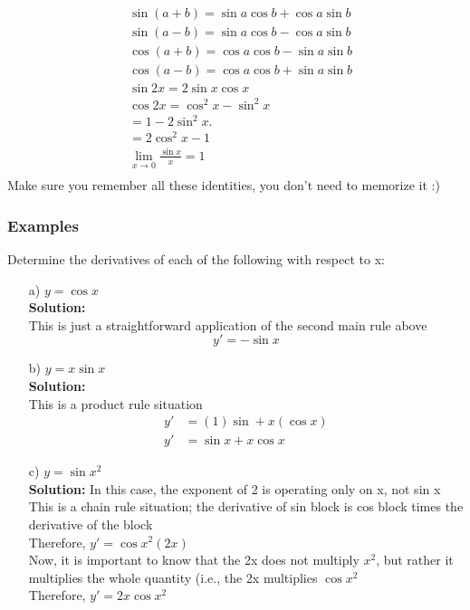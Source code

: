 \documentclass{article}
\begin{document}
\newpage 
\begin{tcolorbox}[colback=Orchid!5!snow, colframe=nadeshikopink!50!white,
  colbacktitle=mordantred19!75!mistyrose, title=Trigonometric Identities ]
$$
\begin{aligned}
& \sin (a+b)=\sin a \cos b+\cos a \sin b \\
& \sin (a-b)=\sin a \cos b-\cos a \sin b \\
& \cos (a+b)=\cos a \cos b-\sin a \sin b \\
& \cos (a-b)=\cos a \cos b+\sin a \sin b \\
& \sin 2 x=2 \sin x \cos x \\
& \cos 2 x=\cos ^2 x-\sin ^2 x \\
& =1-2 \sin ^2 x \text {. } \\
& =2 \cos ^2 x-1 \\
& \lim _{x \rightarrow 0} \frac{\sin x}{x}=1 \\
&
\end{aligned}
$$
Make sure you remember all these identities, you don't need to memorize it :)
\end{tcolorbox}

\subsubsection*{Examples}
Determine the derivatives of each of the following with respect to x:
\begin{enumerate}
    \item[a)] $y=\cos x$\\ 
    \textbf{Solution:}\\
    This is just a straightforward application of the second main rule above
    $$y'=-\sin x$$
    \item[b)] $y=x \sin x$\\
    \textbf{Solution:}\\
    This is a product rule situation
    \begin{align*}
        y'&=(1)\sin + x(\cos x)\\
        y'&=\sin x + x\cos x
    \end{align*}
    \item[c)] $y=\sin x^2$\\
    \textbf{Solution:} In this case, the exponent of 2 is operating only on x, not sin x\\
    This is a chain rule situation; the derivative of sin block is cos block times the derivative of the block \\
    Therefore, $y'=\cos x^2(2x)$\\
    Now, it is important to know that the 2x does not multiply $x^2$, but rather it multiplies the whole quantity (i.e., the 2x multiplies $\cos x^2$\\
    Therefore, $y'=2x\cos x^2$\\

\end{enumerate}
\end{document}
